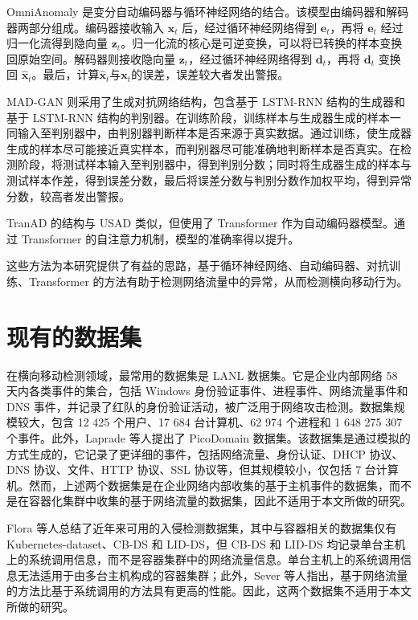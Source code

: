 {OmniAnomaly\citep{su2019robust} 是变分自动编码器与循环神经网络的结合。该模型由编码器和解码器两部分组成。编码器接收输入 $\mathbf{x}_t$ 后，经过循环神经网络得到 $\mathbf{e}_t$，再将 $\mathbf{e}_t$ 经过归一化流得到隐向量 $\mathbf{z}_t$。归一化流的核心是可逆变换，可以将已转换的样本变换回原始空间。解码器则接收隐向量 $\mathbf{z}_t$，经过循环神经网络得到 $\mathbf{d}_t$，再将 $\mathbf{d}_t$ 变换回 $\hat{\mathbf{x}}_t$。最后，计算$\hat{\mathbf{x}}_t$与$\mathbf{x}_t$的误差，误差较大者发出警报。

MAD-GAN\citep{li2019mad} 则采用了生成对抗网络结构，包含基于 LSTM-RNN 结构的生成器和基于 LSTM-RNN 结构的判别器。在训练阶段，训练样本与生成器生成的样本一同输入至判别器中，由判别器判断样本是否来源于真实数据。通过训练，使生成器生成的样本尽可能接近真实样本，而判别器尽可能准确地判断样本是否真实。在检测阶段，将测试样本输入至判别器中，得到判别分数；同时将生成器生成的样本与测试样本作差，得到误差分数，最后将误差分数与判别分数作加权平均，得到异常分数，较高者发出警报。

TranAD\citep{tuli2022tranad} 的结构与 USAD 类似，但使用了 Transformer 作为自动编码器模型。通过 Transformer 的自注意力机制，模型的准确率得以提升。

这些方法为本研究提供了有益的思路，基于循环神经网络、自动编码器、对抗训练、Transformer 的方法有助于检测网络流量中的异常，从而检测横向移动行为。

\section{现有的数据集}

在横向移动检测领域，最常用的数据集是 LANL\citep{kent-2015-cyberdata1} 数据集。它是企业内部网络 58 天内各类事件的集合，包括 Windows 身份验证事件、进程事件、网络流量事件和 DNS 事件，并记录了红队的身份验证活动，被广泛用于网络攻击检测。数据集规模较大，包含 12 425 个用户、17 684 台计算机、62 974 个进程和 1 648 275 307 个事件。此外，Laprade 等人提出了 PicoDomain 数据集\citep{laprade2020picodomain}。该数据集是通过模拟的方式生成的，它记录了更详细的事件，包括网络流量、身份认证、DHCP 协议、DNS 协议、文件、HTTP 协议、SSL 协议等，但其规模较小，仅包括 7 台计算机。然而，上述两个数据集是在企业网络内部收集的基于主机事件的数据集，而不是在容器化集群中收集的基于网络流量的数据集，因此不适用于本文所做的研究。

Flora 等人\citep{floraevaluating}总结了近年来可用的入侵检测数据集，其中与容器相关的数据集仅有 Kubernetes-dataset\citep{sever2023kubernetes}、CB-DS\citep{el2022contextualizing} 和 LID-DS\citep{grimmer2019modern}，但 CB-DS 和 LID-DS 均记录单台主机上的系统调用信息，而不是容器集群中的网络流量信息。单台主机上的系统调用信息无法适用于由多台主机构成的容器集群；此外，Sever 等人\citep{sever2022empirical}指出，基于网络流量的方法比基于系统调用的方法具有更高的性能。因此，这两个数据集不适用于本文所做的研究。

}
